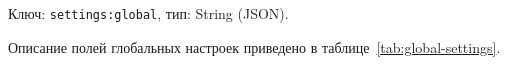 Ключ: \texttt{settings:global}, тип: String (JSON).

Описание полей глобальных настроек приведено в таблице~\ref{tab:global-settings}.



